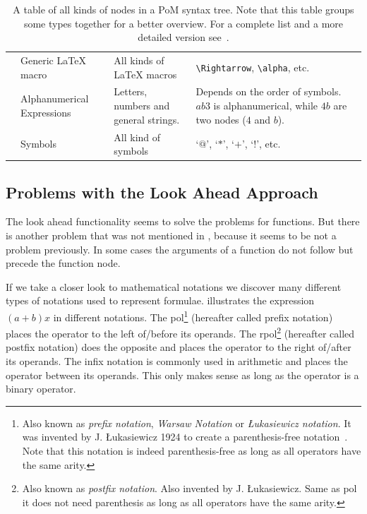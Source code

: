 \documentclass[a4paper,11pt]{article}
\newcommand{\tbs}{\textbackslash}
\theoremstyle{defTheoStyle}
\theoremstyle{defExampStyle}
\begin{document}
\begin{table}[t!]
\begin{tabularx}{\textwidth}{Y{1.55cm} Y{2.5cm} L L}
	 & Generic \LaTeX{} macro & All kinds of \LaTeX{} macros & \texttt{\tbs Rightarrow}, \texttt{\tbs alpha}, etc.\\
	 & Alphanumerical Expressions & Letters, numbers and general strings. & Depends on the order of symbols. $ab3$ is alphanumerical, while $4b$ are two nodes ($4$ and $b$).\\
	 & Symbols & All kind of symbols & `$@$', `$*$', `$+$', `$!$', etc.\\
	\hline
\end{tabularx}
\caption{A table of all kinds of nodes in a PoM syntax tree. Note that this table groups some types together for a better overview. For a complete list and a more detailed version see~\parencite{POM-Tagger}.}
\label{tab:allTypesTable}
\end{table} 

\subsection{Problems with the Look Ahead Approach}
The look ahead functionality seems to solve the problems for functions. But there is another problem that was not mentioned in , because it seems to be not a problem previously. In some cases the arguments of a function do not follow but precede the function node. 

If we take a closer look to mathematical notations we discover many different types of notations used to represent formulae.  illustrates the expression $(a+b)x$ in different notations. The \gls*{pol}\footnote{Also known as \textit{prefix notation}, \textit{Warsaw Notation} or \textit{{\L}ukasiewicz notation}. It was invented by J. {\L}ukasiewicz 1924 to create a parenthesis-free notation~\parencite{Hamblin1962}. Note that this notation is indeed parenthesis-free as long as all operators have the same arity.} (hereafter called prefix notation) places the operator to the left of/before its operands. The \gls*{rpol}\footnote{Also known as \textit{postfix notation}. Also invented by J. {\L}ukasiewicz. Same as \gls*{pol} it does not need parenthesis as long as all operators have the same arity.} (hereafter called postfix notation) does the opposite and places the operator to the right of/after its operands. The infix notation is commonly used in arithmetic and places the operator between its operands. This only makes sense as long as the operator is a binary operator.
\end{document}
